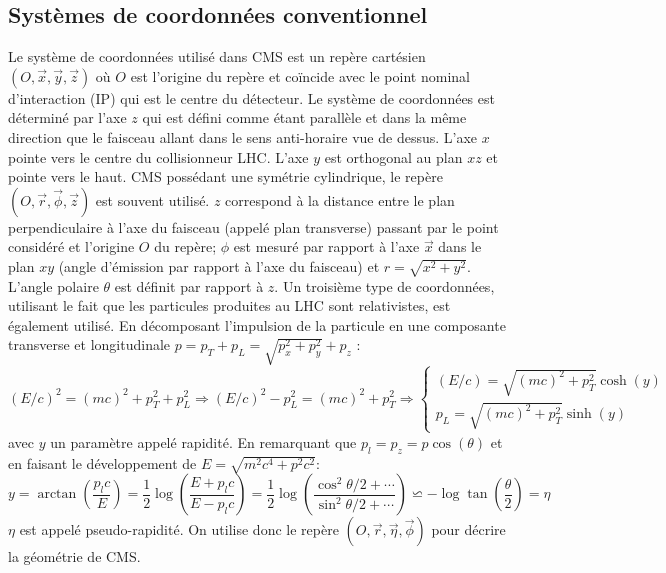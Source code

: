 \subsection{Systèmes de coordonnées conventionnel}
Le système de coordonnées utilisé dans CMS est un repère cartésien $\left(O,\vec{x},\vec{y},\vec{z}\right)$ où $O$ est l'origine du repère et coïncide avec le point nominal d'interaction (IP) qui est le centre du détecteur. Le système de coordonnées est déterminé par l'axe $z$ qui est défini comme étant parallèle et dans la même direction que le faisceau allant dans le sens anti-horaire vue de dessus. L'axe $x$ pointe vers le centre du collisionneur LHC. L'axe $y$ est orthogonal au plan $xz$ et pointe vers le haut. CMS possédant une symétrie cylindrique, le repère $\left(O,\vec{r},\vec{\phi},\vec{z}\right)$ est souvent utilisé. $z$ correspond à la distance entre le plan perpendiculaire à l'axe du faisceau (appelé plan transverse) passant par le point considéré et l'origine $O$ du repère; $\phi$ est mesuré par rapport à l'axe $\vec{x}$ dans le plan $xy$ (angle d'émission par rapport à l'axe du faisceau) et $r=\sqrt{x^2+y^2}$. L'angle polaire $\theta$ est définit par rapport à $z$. Un troisième type de coordonnées, utilisant le fait que les particules produites au LHC sont relativistes, est également utilisé. En décomposant l'impulsion de la particule en une composante transverse et longitudinale $p=p_{T}+p_{L}=\sqrt{p_{x}^{2}+p_{y}^{2}}+p_{z}$ :
\begin{equation}
(E/c)^{2}=(mc)^{2}+p_{T}^{2}+p_{L}^{2}\Longrightarrow (E/c)^{2}-p_{L}^{2}=(mc)^{2}+p_{T}^{2}\Longrightarrow  \begin{cases}
\left(E/c \right)=\sqrt{\left(mc \right)^{2}+p_{T}^{2}}\cosh(y) \\
p_{L}=\sqrt{\left(mc \right)^{2}+p_{T}^{2}}\sinh(y)
\end{cases}
\end{equation}
avec $y$ un paramètre appelé rapidité. En remarquant que $p_{l}=p_{z}=p\cos(\theta)$ et en faisant le développement de $E=\sqrt{m^{2}c^{4}+p^{2}c^{2}}$:
\begin{equation}
y=\arctan\left(\frac{p_{l}c}{E}\right)=\frac{1}{2}\log\left(\frac{E+p_{l}c}{E-p_{l}c}\right)=\frac{1}{2}\log\left(\frac{\cos^2 \theta/2+\cdots}{\sin^2 \theta/2+\cdots}\right)\backsimeq-\log\tan\left(\frac{\theta}{2}\right)=\eta
\end{equation}
$\eta$ est appelé pseudo-rapidité. On utilise donc le repère $\left(O,\vec{r},\vec{\eta},\vec{\phi}\right)$ pour décrire la géométrie de CMS.

